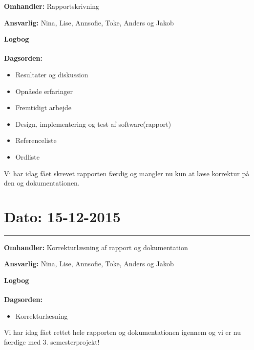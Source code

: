 \textbf{Omhandler:} Rapportskrivning

\textbf{Ansvarlig:} Nina, Lise, Annsofie, Toke, Anders og Jakob

\textbf{Logbog}
\\
\\
\textbf{Dagsorden:}
\begin{itemize}
	\item Resultater og diskussion
	\item Opnåede erfaringer
	\item Fremtidigt arbejde
	\item Design, implementering og test af software(rapport)
	\item Referenceliste
	\item Ordliste
\end{itemize}

Vi har idag fået skrevet rapporten færdig og mangler nu kun at læse korrektur på den og dokumentationen. 
	
	
	
\section{Dato: 15-12-2015 }
\hrule

\textbf{Omhandler:} Korrekturlæsning af rapport og dokumentation

\textbf{Ansvarlig:} Nina, Lise, Annsofie, Toke, Anders og Jakob

\textbf{Logbog}
\\
\\
\textbf{Dagsorden:}
\begin{itemize}
	\item Korrekturlæsning
\end{itemize}

Vi har idag fået rettet hele rapporten og dokumentationen igennem og vi er nu færdige med 3. semesterprojekt!



	
	


